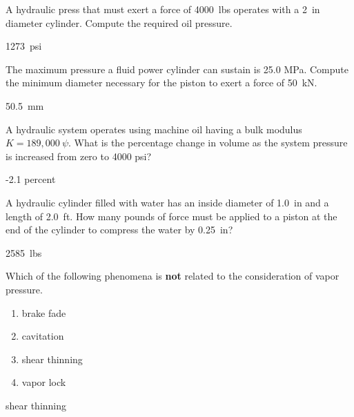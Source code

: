 \documentclass[12pt]{article}
\begin{document}
\begin{question}
A hydraulic press that must exert a force of 4000~lbs operates with a 2~in diameter cylinder.  Compute the required oil pressure.

\begin{solution}
1273~psi
\end{solution}


\end{question}

\begin{question}
The maximum pressure a fluid power cylinder can sustain is 25.0 MPa.  Compute the minimum diameter necessary for the piston to exert a force of 50~kN.

\begin{solution}
50.5~mm
\end{solution}

\end{question}

\begin{question}
A hydraulic system operates using machine oil having a bulk modulus $K=189,000~\psi$.  What is the percentage change in volume as the system pressure is increased from zero to 4000 psi?

\begin{solution}
-2.1 percent
\end{solution}

\end{question}

\begin{question}
A hydraulic cylinder filled with water has an inside diameter of 1.0~in and a length of 2.0~ft. How many pounds of force must be applied to a piston at the end of the cylinder to compress the water by 0.25~in?

\begin{solution}
2585~lbs
\end{solution}

\end{question}

\begin{question}

Which of the following phenomena is {\bf not} related to the consideration of vapor pressure.

\begin{enumerate}
  \item brake fade
  \item cavitation
  \item shear thinning
  \item vapor lock
\end{enumerate}

\begin{solution}
shear thinning
\end{solution}

\end{question}
\end{document}
